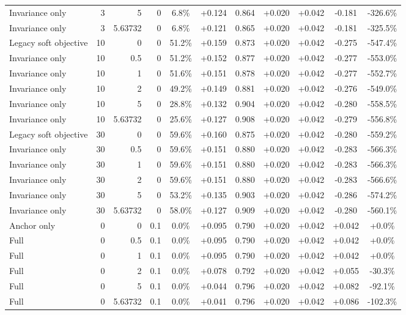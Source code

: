 \begin{table}[htbp]
\begin{tabular}{lrrrccccccc}
Invariance only & 3 & 5 & 0 & 6.8\% & +0.124 & 0.864 & +0.020 & +0.042 & -0.181 & -326.6\% \\
Invariance only & 3 & 5.63732 & 0 & 6.8\% & +0.121 & 0.865 & +0.020 & +0.042 & -0.181 & -325.5\% \\
Legacy soft objective & 10 & 0 & 0 & 51.2\% & +0.159 & 0.873 & +0.020 & +0.042 & -0.275 & -547.4\% \\
Invariance only & 10 & 0.5 & 0 & 51.2\% & +0.152 & 0.877 & +0.020 & +0.042 & -0.277 & -553.0\% \\
Invariance only & 10 & 1 & 0 & 51.6\% & +0.151 & 0.878 & +0.020 & +0.042 & -0.277 & -552.7\% \\
Invariance only & 10 & 2 & 0 & 49.2\% & +0.149 & 0.881 & +0.020 & +0.042 & -0.276 & -549.0\% \\
Invariance only & 10 & 5 & 0 & 28.8\% & +0.132 & 0.904 & +0.020 & +0.042 & -0.280 & -558.5\% \\
Invariance only & 10 & 5.63732 & 0 & 25.6\% & +0.127 & 0.908 & +0.020 & +0.042 & -0.279 & -556.8\% \\
Legacy soft objective & 30 & 0 & 0 & 59.6\% & +0.160 & 0.875 & +0.020 & +0.042 & -0.280 & -559.2\% \\
Invariance only & 30 & 0.5 & 0 & 59.6\% & +0.151 & 0.880 & +0.020 & +0.042 & -0.283 & -566.3\% \\
Invariance only & 30 & 1 & 0 & 59.6\% & +0.151 & 0.880 & +0.020 & +0.042 & -0.283 & -566.3\% \\
Invariance only & 30 & 2 & 0 & 59.6\% & +0.151 & 0.880 & +0.020 & +0.042 & -0.283 & -566.6\% \\
Invariance only & 30 & 5 & 0 & 53.2\% & +0.135 & 0.903 & +0.020 & +0.042 & -0.286 & -574.2\% \\
Invariance only & 30 & 5.63732 & 0 & 58.0\% & +0.127 & 0.909 & +0.020 & +0.042 & -0.280 & -560.1\% \\
Anchor only & 0 & 0 & 0.1 & 0.0\% & +0.095 & 0.790 & +0.020 & +0.042 & +0.042 & +0.0\% \\
Full & 0 & 0.5 & 0.1 & 0.0\% & +0.095 & 0.790 & +0.020 & +0.042 & +0.042 & +0.0\% \\
Full & 0 & 1 & 0.1 & 0.0\% & +0.095 & 0.790 & +0.020 & +0.042 & +0.042 & +0.0\% \\
Full & 0 & 2 & 0.1 & 0.0\% & +0.078 & 0.792 & +0.020 & +0.042 & +0.055 & -30.3\% \\
Full & 0 & 5 & 0.1 & 0.0\% & +0.044 & 0.796 & +0.020 & +0.042 & +0.082 & -92.1\% \\
Full & 0 & 5.63732 & 0.1 & 0.0\% & +0.041 & 0.796 & +0.020 & +0.042 & +0.086 & -102.3\% \\

\end{tabular}
\end{table}
